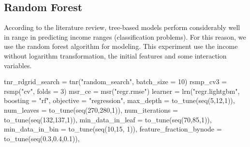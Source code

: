 \documentclass[11pt,a4paper]{article}
\newenvironment{Shaded}{\begin{snugshade}}{\end{snugshade}}
\newcommand{\AttributeTok}[1]{\textcolor[rgb]{0.77,0.63,0.00}{#1}}
\newcommand{\DecValTok}[1]{\textcolor[rgb]{0.00,0.00,0.81}{#1}}
\newcommand{\FloatTok}[1]{\textcolor[rgb]{0.00,0.00,0.81}{#1}}
\newcommand{\FunctionTok}[1]{\textcolor[rgb]{0.00,0.00,0.00}{#1}}
\newcommand{\NormalTok}[1]{#1}
\newcommand{\OtherTok}[1]{\textcolor[rgb]{0.56,0.35,0.01}{#1}}
\newcommand{\StringTok}[1]{\textcolor[rgb]{0.31,0.60,0.02}{#1}}
\begin{document}
\hypertarget{random-forest}{%
\subsection{Random Forest}\label{random-forest}}

According to the literature review, tree-based models perform
considerably well in range in predicting income ranges (classification
problems). For this reason, we use the random forest algorithm for
modeling. This experiment use the income without logarithm
transformation, the initial features and some interaction variables.

\begin{Shaded}
\begin{Highlighting}[]
\NormalTok{tnr\_rdgrid\_search }\OtherTok{=} \FunctionTok{tnr}\NormalTok{(}\StringTok{"random\_search"}\NormalTok{, }\AttributeTok{batch\_size =} \DecValTok{10}\NormalTok{)}
\NormalTok{rsmp\_cv3 }\OtherTok{=} \FunctionTok{rsmp}\NormalTok{(}\StringTok{"cv"}\NormalTok{, }\AttributeTok{folds =} \DecValTok{3}\NormalTok{)}
\NormalTok{msr\_ce }\OtherTok{=} \FunctionTok{msr}\NormalTok{(}\StringTok{"regr.rmse"}\NormalTok{)}
\NormalTok{learner }\OtherTok{=} \FunctionTok{lrn}\NormalTok{(}\StringTok{"regr.lightgbm"}\NormalTok{,}
              \AttributeTok{boosting =} \StringTok{"rf"}\NormalTok{,}
              \AttributeTok{objective =} \StringTok{"regression"}\NormalTok{,}
              \AttributeTok{max\_depth =} \FunctionTok{to\_tune}\NormalTok{(}\FunctionTok{seq}\NormalTok{(}\DecValTok{5}\NormalTok{,}\DecValTok{12}\NormalTok{,}\DecValTok{1}\NormalTok{)),}
              \AttributeTok{num\_leaves =} \FunctionTok{to\_tune}\NormalTok{(}\FunctionTok{seq}\NormalTok{(}\DecValTok{270}\NormalTok{,}\DecValTok{280}\NormalTok{,}\DecValTok{1}\NormalTok{)),}
              \AttributeTok{num\_iterations  =} \FunctionTok{to\_tune}\NormalTok{(}\FunctionTok{seq}\NormalTok{(}\DecValTok{132}\NormalTok{,}\DecValTok{137}\NormalTok{,}\DecValTok{1}\NormalTok{)),}
              \AttributeTok{min\_data\_in\_leaf =} \FunctionTok{to\_tune}\NormalTok{(}\FunctionTok{seq}\NormalTok{(}\DecValTok{70}\NormalTok{,}\DecValTok{85}\NormalTok{,}\DecValTok{1}\NormalTok{)),}
              \AttributeTok{min\_data\_in\_bin =} \FunctionTok{to\_tune}\NormalTok{(}\FunctionTok{seq}\NormalTok{(}\DecValTok{10}\NormalTok{,}\DecValTok{15}\NormalTok{, }\DecValTok{1}\NormalTok{)),}
              \AttributeTok{feature\_fraction\_bynode =} \FunctionTok{to\_tune}\NormalTok{(}\FunctionTok{seq}\NormalTok{(}\FloatTok{0.3}\NormalTok{,}\FloatTok{0.4}\NormalTok{,}\FloatTok{0.1}\NormalTok{)),}

\end{Highlighting}
\end{Shaded}
\end{document}
